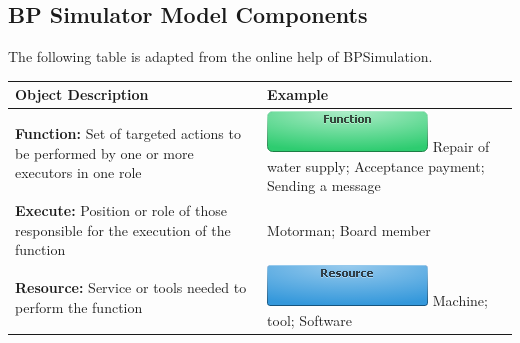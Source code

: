\documentclass[]{book}
\begin{document}
\hypertarget{bp-simulator-model-components}{%
\subsection{BP Simulator Model Components}\label{bp-simulator-model-components}}

The following table is adapted from the online help of BPSimulation. \citep{BPSSimulator2018}

\begin{longtable}[]{@{}ll@{}}
\toprule
\begin{minipage}[b]{0.46\columnwidth}\raggedright
Object Description\strut
\end{minipage} & \begin{minipage}[b]{0.48\columnwidth}\raggedright
Example\strut
\end{minipage}\tabularnewline
\midrule
\endhead
\begin{minipage}[t]{0.46\columnwidth}\raggedright
\textbf{Function:} Set of targeted actions to be performed by one or more executors in one role\strut
\end{minipage} & \begin{minipage}[t]{0.48\columnwidth}\raggedright
\includegraphics{images/function.png} \newline      Repair of water supply; Acceptance payment; Sending a message\strut
\end{minipage}\tabularnewline
\begin{minipage}[t]{0.46\columnwidth}\raggedright
\textbf{Execute:} Position or role of those responsible for the execution of the function\strut
\end{minipage} & \begin{minipage}[t]{0.48\columnwidth}\raggedright
Motorman; Board member\strut
\end{minipage}\tabularnewline
\begin{minipage}[t]{0.46\columnwidth}\raggedright
\textbf{Resource:} Service or tools needed to perform the function\strut
\end{minipage} & \begin{minipage}[t]{0.48\columnwidth}\raggedright
\includegraphics{images/resource.png} \newline Machine; tool; Software\strut

\end{minipage}
\end{longtable}
\end{document}

